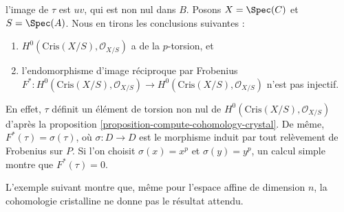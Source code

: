 \begin{example}
l'image de $\tau$ est $uv$, qui est non nul dans $B$.
Posons $X = \Spec(C)$ et $S = \Spec(A)$.
Nous en tirons les conclusions suivantes :
\begin{enumerate}
\item $H^0(\text{Cris}(X/S), \mathcal{O}_{X/S})$ a de la $p$-torsion, et
\item l'endomorphisme d'image réciproque par Frobenius $F^* : H^0(\text{Cris}(X/S), \mathcal{O}_{X/S})
\to H^0(\text{Cris}(X/S), \mathcal{O}_{X/S})$ n'est pas injectif.
\end{enumerate}
En effet, $\tau$ définit un élément de torsion non nul de
$H^0(\text{Cris}(X/S), \mathcal{O}_{X/S})$ d'après la
proposition \ref{proposition-compute-cohomology-crystal}.
De même, $F^*(\tau) = \sigma(\tau)$, où $\sigma : D \to D$ est le
morphisme induit par tout relèvement de Frobenius sur $P$. Si l'on choisit $\sigma(x) = x^p$
et $\sigma(y) = y^p$, un calcul simple montre que $F^*(\tau) = 0$.
\end{example}

\noindent
L'exemple suivant montre que, même pour l'espace affine de dimension $n$, la cohomologie
cristalline ne donne pas le résultat attendu.

